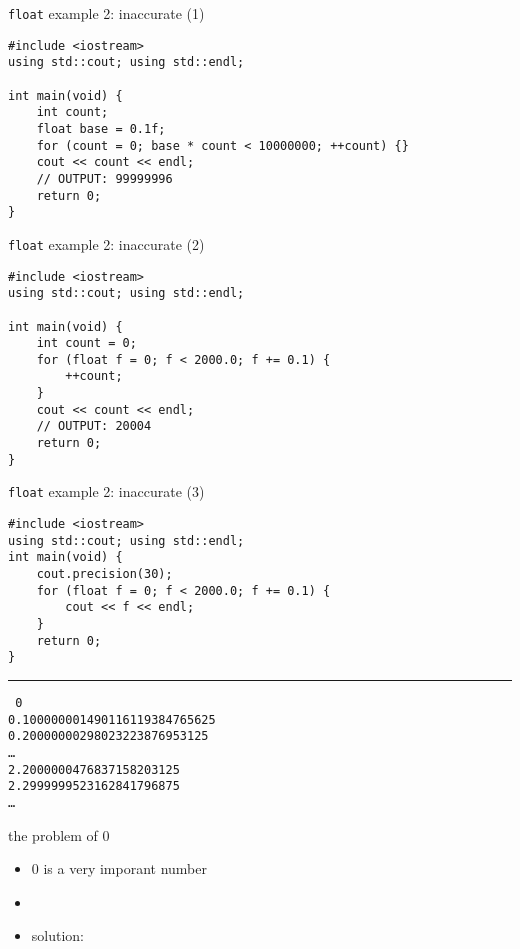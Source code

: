 \begin{frame}[fragile,label=floatEx2In1]{\texttt{float} example 2: inaccurate (1)}
\lstset{
    language=C++,
    style=smaller
}
\begin{lstlisting}
#include <iostream>
using std::cout; using std::endl;

int main(void) {
    int count;
    float base = 0.1f;
    for (count = 0; base * count < 10000000; ++count) {}
    cout << count << endl;
    // OUTPUT: 99999996
    return 0;
}
\end{lstlisting}
\end{frame}

\begin{frame}[fragile,label=floatEx2In2]{\texttt{float} example 2: inaccurate (2)}
\lstset{
    language=C++,
    style=smaller
}
\begin{lstlisting}
#include <iostream>
using std::cout; using std::endl;

int main(void) {
    int count = 0;
    for (float f = 0; f < 2000.0; f += 0.1) {
        ++count;
    }
    cout << count << endl;
    // OUTPUT: 20004
    return 0;
}
\end{lstlisting}
\end{frame}

\begin{frame}[fragile,label=floatEx2In3]{\texttt{float} example 2: inaccurate (3)}
\lstset{
    language=C++,
    style=smaller
}
\begin{lstlisting}
#include <iostream>
using std::cout; using std::endl;
int main(void) {
    cout.precision(30);
    for (float f = 0; f < 2000.0; f += 0.1) {
        cout << f << endl;
    }
    return 0;
}
\end{lstlisting}
\hrule
\small\tt
0 \\
0.100000001490116119384765625 \\
0.20000000298023223876953125 \\
\ldots \\
2.2000000476837158203125 \\
2.2999999523162841796875 \\
\ldots
\end{frame}

\begin{frame}{the problem of 0}
\begin{itemize}
\item 0 is a very imporant number
\item {}
\vspace{.5cm}
\item solution: 
\end{itemize}
\end{frame}

